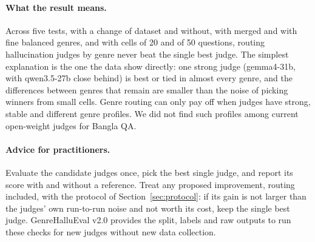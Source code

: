 \documentclass[pdflatex,sn-apa]{sn-jnl}
\begin{document}
\paragraph{What the result means.} Across five tests, with a change of dataset and without, with merged and with fine
balanced genres, and with cells of 20 and of 50 questions, routing hallucination judges by genre never beat the single
best judge. The simplest explanation is the one the data show directly: one strong judge (gemma4-31b, with qwen3.5-27b
close behind) is best or tied in almost every genre, and the differences between genres that remain are smaller than
the noise of picking winners from small cells. Genre routing can only pay off when judges have strong, stable and
different genre profiles. We did not find such profiles among current open-weight judges for Bangla QA.

\paragraph{Advice for practitioners.} Evaluate the candidate judges once, pick the best single judge, and report its
score with and without a reference. Treat any proposed improvement, routing included, with the protocol of
Section~\ref{sec:protocol}: if its gain is not larger than the judges' own run-to-run noise and not worth its cost,
keep the single best judge. GenreHalluEval v2.0 provides the split, labels and raw outputs to run these checks for new
judges without new data collection.
\end{document}
